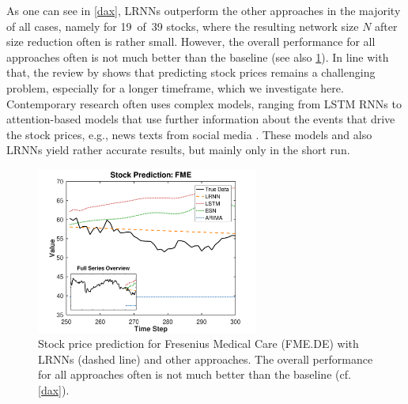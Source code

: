 \documentclass[twoside,11pt]{article}
\theoremstyle{definition}
\begin{document}
As one can see in \cref{dax}, LRNNs outperform the other approaches in the
majority of all cases, namely for 19~of~39 stocks, where the resulting network
size $N$ after size reduction often is rather small. However, the overall
performance for all approaches often is not much better than the baseline (see
also \cref{stockfig}). In line with that, the review by \citet{SIZ19} shows that
predicting stock prices remains a challenging problem, especially for a longer
timeframe, which we investigate
here. Contemporary research often uses complex models, ranging from LSTM RNNs
\citep{NPO17,RPV17} to attention-based models that use further information about
the events that drive the stock prices, e.g., news texts from social media
\citep{LL+19}. These models and also LRNNs yield rather accurate results, but mainly
only in the short run.

\begin{figure}
  \centering
  \includegraphics[width=0.65\textwidth]{fig/stock_prediction_fme}
  \caption{Stock price prediction for Fresenius Medical Care (FME.DE) with LRNNs
	(dashed line) and other approaches. The overall performance for all
	approaches often is not much better than the baseline (cf. \cref{dax}).}
  \label{stockfig}
\end{figure}
\end{document}

